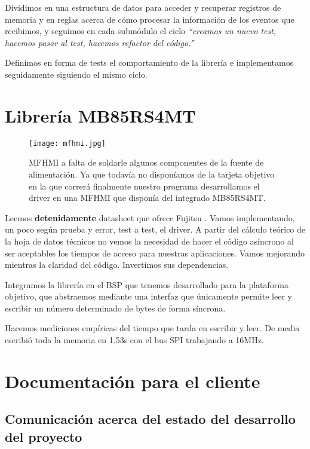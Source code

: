 Dividimos en una estructura de datos para acceder y recuperar registros de memoria
y en reglas acerca de cómo procesar la información de los eventos que recibimos,
y seguimos en cada submódulo el ciclo \textit{``creamos un nuevo test, hacemos pasar
al test, hacemos refactor del código.''} \cite{TDD}

Definimos en forma de tests el comportamiento de la librería e implementamos
seguidamente siguiendo el mismo ciclo.

\section{Librería MB85RS4MT}

\begin{figure}[h]
    \centering
    \texttt{[image: mfhmi.jpg]}
    \caption{MFHMI a falta de soldarle algunos componentes de la fuente de alimentación.
    Ya que todavía no disponíamos de la tarjeta objetivo en la que correrá
    finalmente nuestro programa desarrollamos el driver en una MFHMI que disponía
    del integrado MB85RS4MT.}
\end{figure}

Leemos \textbf{detenidamente} datasheet que ofrece Fujitsu \cite{Fujitsu:MB85RS4MT}.
Vamos implementando, un poco según prueba y error, test a test, el driver.
A partir del cálculo teórico de la hoja de datos técnicos no vemos la
necesidad de hacer el código asíncrono al ser aceptables los tiempos de acceso para
nuestras aplicaciones.
Vamos mejorando mientras la claridad del código. Invertimos sus dependencias. 

Integramos la librería en el BSP que tenemos desarrollado para la plataforma objetivo,
que abstraemos mediante una interfaz que únicamente permite leer y escribir un
número determinado de bytes de forma síncrona.

Hacemos mediciones empíricas del tiempo que tarda en escribir y leer. De media escribió
toda la memoria en 1.53s con el bus SPI trabajando a 16MHz.

\vspace*{\fill}

\pagebreak

\section{Documentación para el cliente}

\subsection{Comunicación acerca del estado del desarrollo del proyecto} \label{sec:plan_de_desarrollo}

